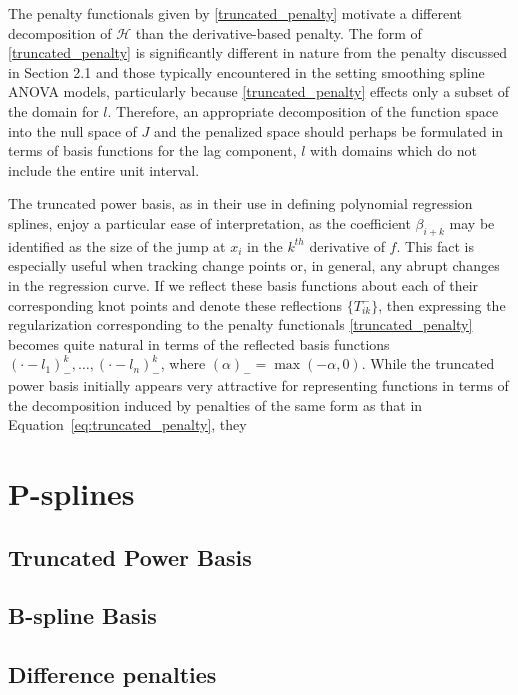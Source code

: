 \documentclass[12pt]{article}
\theoremstyle{definition}
\begin{document}
The penalty functionals given by \eqref{truncated_penalty} motivate a different decomposition of $\mathcal{H}$ than the derivative-based penalty. The form of \eqref{truncated_penalty} is significantly different in nature from the penalty discussed in Section 2.1 and those typically encountered in the setting smoothing spline ANOVA models, particularly because \eqref{truncated_penalty} effects only a subset of the domain for $l$. Therefore, an appropriate decomposition of the function space into the null space of $J$ and the penalized space should perhaps be formulated in terms of basis functions for the lag component, $l$ with domains which do not include the entire unit interval. 

The truncated power basis, as in their use in defining polynomial regression splines, enjoy a particular ease of interpretation, as the coefficient $\beta_{i+k}$ may be identified as the size of the jump at $x_i$ in the $k^{th}$ derivative of $f$. This fact is especially useful when tracking change points or, in general, any abrupt changes in the regression curve. If we reflect these basis functions about each of their corresponding knot points and denote these reflections $\lbrace T^-_{ik}\rbrace$, then expressing the regularization corresponding to the penalty functionals \eqref{truncated_penalty} becomes quite natural in terms of the reflected basis functions $\left(\cdot - l_1 \right)^k_-,\dots, \left(\cdot - l_n \right)^k_-$, where $\left( \alpha \right)_- = \max\left(-\alpha,0\right)$.  While the truncated power basis initially appears very attractive for representing functions in terms of the decomposition induced by penalties of the same form as that in Equation~\ref{eq:truncated_penalty}, they 

\section{P-splines}

\subsection{Truncated Power Basis}

\subsection{B-spline Basis}
\subsection{Difference penalties}
\end{document}
